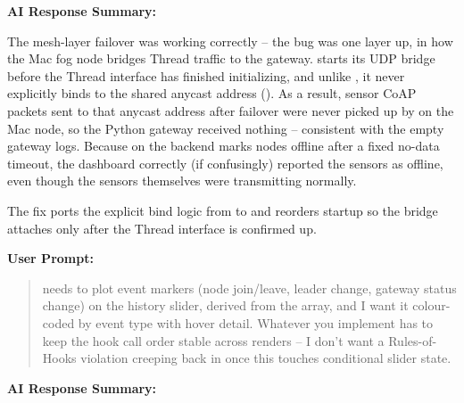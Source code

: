 \documentclass[conference]{IEEEtran}
\begin{document}
\noindent\textbf{AI Response Summary:}\par

The mesh-layer failover was working correctly -- the bug was one layer up, in how the Mac fog node bridges Thread traffic to the gateway. \texttt{} starts its \texttt{} UDP bridge before the \texttt{} Thread interface has finished initializing, and unlike \texttt{}, it never explicitly binds \texttt{} to the shared anycast address (\texttt{}). As a result, sensor CoAP packets sent to that anycast address after failover were never picked up by \texttt{} on the Mac node, so the Python gateway received nothing -- consistent with the empty gateway logs. Because \texttt{} on the backend marks nodes offline after a fixed no-data timeout, the dashboard correctly (if confusingly) reported the sensors as offline, even though the sensors themselves were transmitting normally.

The fix ports the explicit \texttt{} bind logic from \texttt{} to \texttt{} and reorders startup so the bridge attaches only after the Thread interface is confirmed up.

\par\vspace{4pt}\par\vspace{2pt}

\noindent\textbf{User Prompt:}\par

\begin{quote}
\texttt{} needs to plot event markers (node join/leave, leader change, gateway status change) on the history slider, derived from the \texttt{} array, and I want it colour-coded by event type with hover detail. Whatever you implement has to keep the hook call order stable across renders -- I don't want a Rules-of-Hooks violation creeping back in once this touches conditional slider state.
\end{quote}

\noindent\textbf{AI Response Summary:}\par
\end{document}
